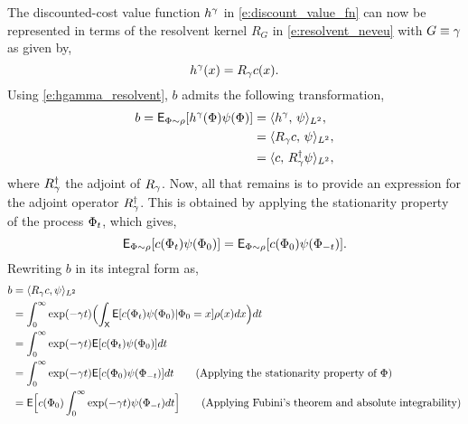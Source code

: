 The discounted-cost value function $h^\gamma$ in \eqref{e:discount_value_fn} can now be represented in terms of the resolvent kernel $R_G$ in \eqref{e:resolvent_neveu} with $G \equiv \gamma$ as given by,
\begin{equation}
h^\discount(x) = R_\discount c(x).
\label{e:hgamma_resolvent}
\end{equation}
Using \eqref{e:hgamma_resolvent}, $b$ admits the following transformation,
\[
\begin{aligned}
b = {\sf E}_{\Phi \sim \rho} [h^\gamma(\Phi) \psi(\Phi) ] &= \langle h^\gamma, \, \psi \rangle_{L^2} ,\\
& = \langle R_\gamma c, \,\psi \rangle_{L^2}, \\
& = \langle c,\, R^\dagger_\gamma \psi \rangle_{L^2},
\end{aligned}
\]
where $R^\dagger_\gamma$ the adjoint of $R_\gamma$. Now, all that remains is to provide an expression for the adjoint operator $R^\dagger_\gamma$. This is obtained by applying the stationarity property of the process $\Phi_t$, which gives, 
\[
{\sf E}_{\Phi \sim \rho}[c(\Phi_t) \psi(\Phi_0)] = {\sf E}_{\Phi \sim \rho} [c(\Phi_0) \psi(\Phi_{-t})].
\] 
Rewriting $b$ in its integral form as,
\begin{equation}
\begin{aligned}
b & = \langle R_\discount c, \basis \rangle_{L^2} \\
& = \int_0^\infty \exp(-\discount t)  \Bigl(\int_{\state} \Expect[c(\markovstate_t) \basis(\markovstate_0)| \markovstate_0 = x]  \pr(x) dx \Bigr) dt \\
& = \int_0^\infty \exp(-\discount t) \Expect[c(\markovstate_t) \basis(\markovstate_0)]dt \\
& = \int_0^\infty \exp(-\discount t) \Expect[c(\markovstate_0) \basis(\markovstate_{-t})] dt \qquad \text{(Applying the stationarity property of $\markovstate$)}\\
& = \Expect\Bigl[c(\markovstate_0) \int_0^\infty \exp(-\discount t) \basis(\markovstate_{-t})dt\Bigr]  \qquad \text{(Applying Fubini's theorem and absolute integrability)}
\label{e:lstd_resolution}
\end{aligned}
\end{equation}
